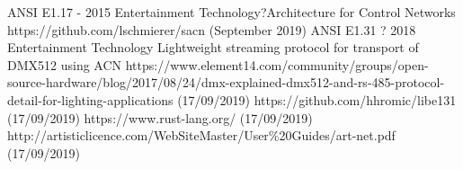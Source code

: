 \documentclass[11pt,a4paper,notitlepage]{report}
\begin{document}
	\begin{thebibliography}{9}
		ANSI E1.17 - 2015 Entertainment Technology?Architecture for Control Networks
		https://github.com/lschmierer/sacn (September 2019)
		ANSI E1.31 ? 2018 Entertainment Technology Lightweight streaming protocol for transport of DMX512 using ACN
		https://www.element14.com/community/groups/open-source-hardware/blog/2017/08/24/dmx-explained-dmx512-and-rs-485-protocol-detail-for-lighting-applications (17/09/2019)
		https://github.com/hhromic/libe131 (17/09/2019)
		https://www.rust-lang.org/ (17/09/2019)
		http://artisticlicence.com/WebSiteMaster/User\%20Guides/art-net.pdf (17/09/2019)
		
		
	\end{thebibliography}
	
\end{document}
